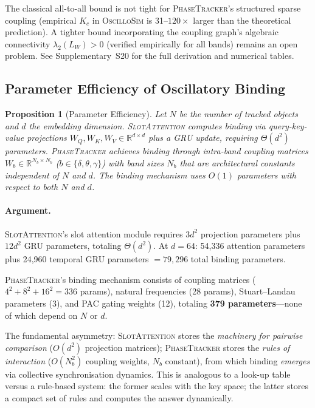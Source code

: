 \documentclass[11pt]{article}
\newtheorem{proposition}{Proposition}
\providecommand{\oscillosim}{\textnormal{\textsc{OscilloSim}}\xspace}
\providecommand{\pt}{\textnormal{\textsc{PhaseTracker}}\xspace}
\providecommand{\sa}{\textnormal{\textsc{SlotAttention}}\xspace}
\providecommand{\R}{\mathbb{R}}
\begin{document}
The classical all-to-all bound is not tight for \pt's structured
sparse coupling (empirical $K_c$ in \oscillosim is 31--$120\times$
larger than the theoretical prediction).  A tighter bound incorporating
the coupling graph's algebraic connectivity $\lambda_2(L_W) > 0$
(verified empirically for all bands) remains an open problem.
See Supplementary~S20 for the full derivation and numerical tables.

\subsection{Parameter Efficiency of Oscillatory Binding}
\label{sec:param_theory}

\begin{proposition}[Parameter Efficiency]
\label{prop:efficiency}
Let $N$ be the number of tracked objects and $d$ the embedding
dimension.  \sa computes binding via query-key-value projections
$W_Q, W_K, W_V \in \R^{d \times d}$ plus a GRU update, requiring
$\Theta(d^2)$ parameters.  \pt achieves binding through intra-band
coupling matrices $W_b \in \R^{N_b \times N_b}$ ($b \in \{\delta,
\theta, \gamma\}$) with band sizes $N_b$ that are architectural
constants independent of $N$ and $d$.  The binding mechanism uses
$O(1)$ parameters with respect to both $N$ and $d$.
\end{proposition}

\paragraph{Argument.}
\sa's slot attention module requires $3d^2$ projection parameters plus
$12d^2$ GRU parameters, totaling $\Theta(d^2)$.  At $d = 64$:
54{,}336 attention parameters plus 24{,}960 temporal GRU parameters
$= 79{,}296$ total binding parameters.

\pt's binding mechanism consists of coupling matrices
($4^2 + 8^2 + 16^2 = 336$ params), natural frequencies (28 params),
Stuart--Landau parameters (3), and PAC gating weights (12), totaling
\textbf{379 parameters}---none of which depend on $N$ or $d$.

The fundamental asymmetry: \sa stores the \emph{machinery for
pairwise comparison} ($O(d^2)$ projection matrices); \pt stores the
\emph{rules of interaction} ($O(N_b^2)$ coupling weights, $N_b$
constant), from which binding \emph{emerges} via collective
synchronisation dynamics.  This is analogous to a look-up table
versus a rule-based system: the former scales with the key space; the
latter stores a compact set of rules and computes the answer
dynamically.
\end{document}
